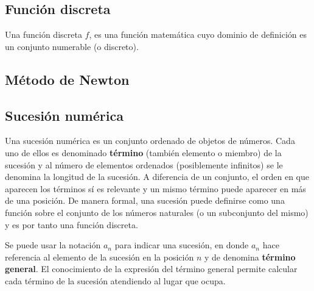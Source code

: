 \subsection{Función discreta}
Una función discreta $f$, es una función matemática cuyo dominio de definición es un conjunto numerable (o discreto).

\subsection{Método de Newton}

\subsection{Sucesión numérica}
Una sucesión numérica es un conjunto ordenado de objetos de números. Cada uno de ellos es denominado \textbf{término} (también elemento o miembro) de la sucesión y al número de elementos ordenados (posiblemente infinitos) se le denomina la longitud de la sucesión. 
A diferencia de un conjunto, el orden en que aparecen los términos sí es relevante y un mismo término puede aparecer en más de una posición. De manera formal, una sucesión puede definirse como una función sobre el conjunto de los números naturales (o un subconjunto del mismo) y es por tanto una función discreta.

Se puede usar la notación $a_n$  para indicar una sucesión, en donde $a_n$ hace referencia al elemento de la sucesión en la posición $n$ y de denomina  \textbf{término general}. El conocimiento de la expresión del término general permite calcular cada término de la sucesión atendiendo al lugar que ocupa.